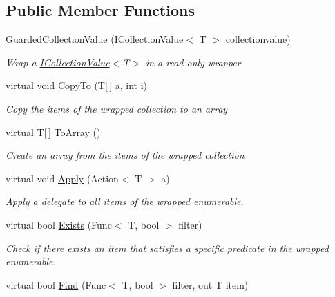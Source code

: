 \subsection*{Public Member Functions}
\begin{DoxyCompactItemize}
\item 
\hyperlink{class_c5_1_1_guarded_collection_value_ae5023d32e21e4f2a340f6b3dc49ffc47}{Guarded\+Collection\+Value} (\hyperlink{interface_c5_1_1_i_collection_value}{I\+Collection\+Value}$<$ T $>$ collectionvalue)
\begin{DoxyCompactList}\small\item\em Wrap a \hyperlink{interface_c5_1_1_i_collection_value}{I\+Collection\+Value}$<$T$>$ in a read-\/only wrapper \end{DoxyCompactList}\item 
virtual void \hyperlink{class_c5_1_1_guarded_collection_value_ae8d04b8fd3c59fe20bdc4a99fb1134f2}{Copy\+To} (T\mbox{[}$\,$\mbox{]} a, int i)
\begin{DoxyCompactList}\small\item\em Copy the items of the wrapped collection to an array \end{DoxyCompactList}\item 
virtual T\mbox{[}$\,$\mbox{]} \hyperlink{class_c5_1_1_guarded_collection_value_ab492c6c9d057b13d2ccbb7ebc259a4f6}{To\+Array} ()
\begin{DoxyCompactList}\small\item\em Create an array from the items of the wrapped collection \end{DoxyCompactList}\item 
virtual void \hyperlink{class_c5_1_1_guarded_collection_value_a212d1ea950a6096f846987476c9e2aa6}{Apply} (Action$<$ T $>$ a)
\begin{DoxyCompactList}\small\item\em Apply a delegate to all items of the wrapped enumerable. \end{DoxyCompactList}\item 
virtual bool \hyperlink{class_c5_1_1_guarded_collection_value_a0c3c6dfb00cd3206e56939a8a49ff622}{Exists} (Func$<$ T, bool $>$ filter)
\begin{DoxyCompactList}\small\item\em Check if there exists an item that satisfies a specific predicate in the wrapped enumerable. \end{DoxyCompactList}\item 
virtual bool \hyperlink{class_c5_1_1_guarded_collection_value_a7bccfb81326892afd0ae30ac5e55cdaa}{Find} (Func$<$ T, bool $>$ filter, out T item)

\end{DoxyCompactItemize}
